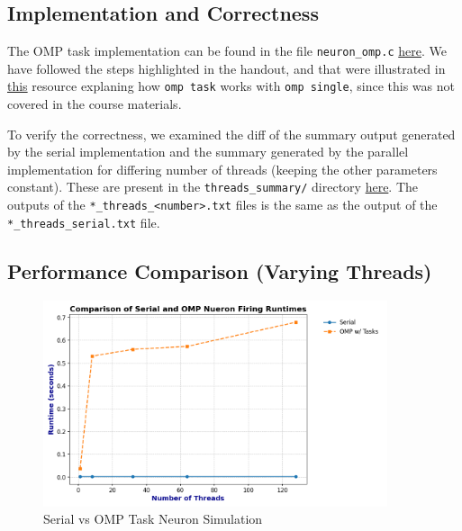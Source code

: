 \documentclass[a4paper,10pt]{article}
\begin{document}
\subsection{Implementation and Correctness}
The OMP task implementation can be found in the file \verb|neuron_omp.c| \href{https://github.com/paulmyr/DD2356-MethodsHPC/blob/master/3_open_mp/bonus/neuron/neuron_omp.c}{here}. We have followed the steps highlighted in the handout, and that were illustrated in \href{https://stackoverflow.com/questions/68502197/how-do-omp-single-and-omp-task-provide-parallelism}{this} resource explaning how \verb|omp task| works with \verb|omp single|, since this was not covered in the course materials. 

To verify the correctness, we examined the diff of the summary output generated by the serial implementation and the summary generated by the parallel implementation for differing number of threads (keeping the other parameters constant). These are present in the \verb|threads_summary/| directory \href{https://github.com/paulmyr/DD2356-MethodsHPC/tree/master/3_open_mp/bonus/neuron/threads_summary}{here}. The outputs of the \verb|*_threads_<number>.txt| files is the same as the output of the \verb|*_threads_serial.txt| file.

\subsection{Performance Comparison (Varying Threads)}
\begin{figure}[H]
  \centering
  \includegraphics[width=0.9\textwidth]{img/bonus/performance_thread_variation.png}
  \caption{Serial vs OMP Task Neuron Simulation}
  \label{fig:bonus_performance}
\end{figure}
\end{document}
